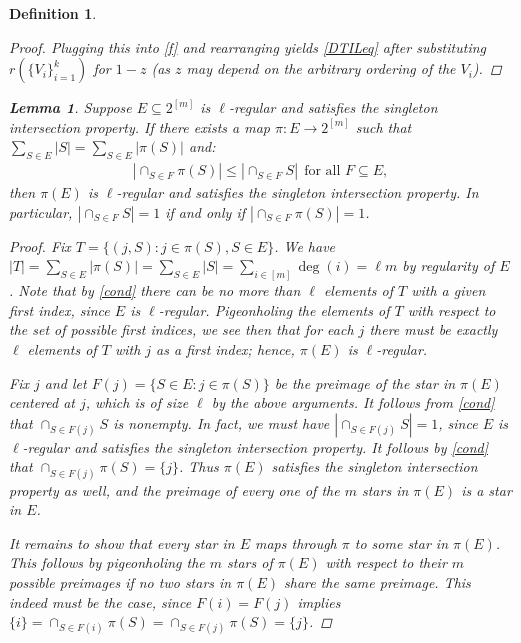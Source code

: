 \documentclass[9pt,twocolumn]{pnas-new}
\newtheorem{lemma}{Lemma}
\newtheorem{definition}{Definition}
\begin{document}
\begin{definition}
\begin{proof}
Plugging this into \eqref{f} and rearranging yields \eqref{DTILeq} after substituting $r(\{V_i\}_{i=1}^k)$ for $1 - z$ (as $z$ may depend on the arbitrary ordering of the $V_i$).
\end{proof}

\begin{lemma}\label{NonEmptyLemma} 
Suppose $E \subseteq 2^{[m]}$ is $\ell$-regular and satisfies the singleton intersection property. If there exists a map $\pi: E \to 2^{[m]}$ such that $\sum_{S \in E} |S| = \sum_{S \in E} |\pi(S)|$ and:
\begin{align}\label{cond}
|\cap_{S \in F} \pi(S)| \leq |\cap_{S \in F} S | \ \ \text{for all } F \subseteq E,
\end{align}
%
then $\pi(E)$ is $\ell$-regular and satisfies the singleton intersection property. In particular, $|\cap_{S \in F} S| = 1$ if and only if $|\cap_{S \in F} \pi(S)| = 1$. 
\end{lemma}
\begin{proof}
Fix $T = \{(j, S): j \in \pi(S), S \in E\}$. We have $|T| = \sum_{S \in E} |\pi(S)| = \sum_{S \in E} |S| = \sum_{i \in [m]} \deg(i) = \ell m$ by regularity of $E$. Note that by \eqref{cond} there can be no more than $\ell$ elements of $T$ with a given first index, since $E$ is $\ell$-regular. Pigeonholing the elements of $T$ with respect to the set of possible first indices, we see then that for each $j$ there must be exactly $\ell$ elements of $T$ with $j$ as a first index; hence, $\pi(E)$ is $\ell$-regular. 

Fix $j$ and let $F(j) = \{S \in E: j \in \pi(S)\}$ be the preimage of the star in $\pi(E)$ centered at $j$, which is of size $\ell$ by the above arguments. It follows from \eqref{cond} that $\cap_{S \in F(j)} S$ is nonempty. In fact, we must have $|\cap _{S \in F(j)} S| = 1$, since $E$ is $\ell$-regular and satisfies the singleton intersection property. It follows by \eqref{cond} that $\cap_{S \in F(j)} \pi(S) = \{j\}$. Thus $\pi(E)$ satisfies the singleton intersection property as well, and the preimage of every one of the $m$ stars in $\pi(E)$ is a star in $E$.

It remains to show that every star in $E$ maps through $\pi$ to some star in $\pi(E)$. This follows by pigeonholing the $m$ stars of $\pi(E)$ with respect to their $m$ possible preimages if no two stars in $\pi(E)$ share the same preimage. This indeed must be the case, since $F(i) = F(j)$ implies $\{i\} = \cap_{S \in F(i)} \pi(S) = \cap_{S \in F(j)} \pi(S) = \{j\}$.
\end{proof}


\end{definition}
\end{document}
